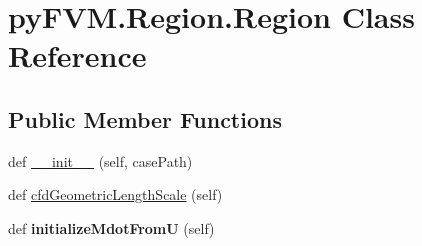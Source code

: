 \hypertarget{classpy_f_v_m_1_1_region_1_1_region}{}\section{py\+F\+V\+M.\+Region.\+Region Class Reference}
\label{classpy_f_v_m_1_1_region_1_1_region}
\subsection*{Public Member Functions}
\begin{DoxyCompactItemize}
\item 
def \mbox{\hyperlink{classpy_f_v_m_1_1_region_1_1_region_ac630b03db4f4502a63f6581f9430d733}{\+\_\+\+\_\+init\+\_\+\+\_\+}} (self, case\+Path)
\item 
def \mbox{\hyperlink{classpy_f_v_m_1_1_region_1_1_region_aa7a1cde8b5d0dcf3fe22ce5186512c87}{cfd\+Geometric\+Length\+Scale}} (self)
\item 
\mbox{\label{classpy_f_v_m_1_1_region_1_1_region_ace5538a4f0208f157825c4b1ad59c2e7}} 
def {\bfseries initialize\+Mdot\+FromU} (self)
\end{DoxyCompactItemize}
